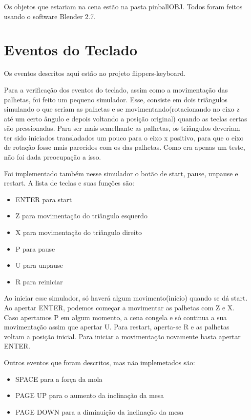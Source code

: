 \documentclass[a4paper,12pt]{article}
\begin{document}
Os objetos que estariam na cena estão na pasta pinballOBJ. Todos foram feitos usando o software Blender 2.7.

\section{Eventos do Teclado}
\mbox{}

Os eventos descritos aqui estão no projeto flippers-keyboard.

Para a verificação dos eventos do teclado, assim como a movimentação das palhetas, foi feito um pequeno simulador. Esse, consiste em dois triângulos simulando o que seriam as palhetas e se 
movimentando(rotacionando no eixo z até um certo ângulo e depois voltando a posição original) quando as teclas certas são pressionadas. Para ser mais semelhante as palhetas, os triângulos
deveriam ter sido iniciados transladados um pouco para o eixo x positivo, para que o eixo de rotação fosse mais parecidos com os das palhetas. Como era apenas um teste, não foi dada 
preocupação a isso.

Foi implementado também nesse simulador o botão de start, pause, unpause e restart. A lista de teclas e suas funções são:

\begin{itemize}
\item ENTER para start
\item Z para movimentação do triângulo esquerdo
\item X para movimentação do triângulo direito
\item P para pause
\item U para unpause
\item R para reiniciar
\end{itemize}

Ao iniciar esse simulador, só haverá algum movimento(início) quando se dá start. Ao apertar ENTER, podemos começar a movimentar as palhetas com Z e X. Caso apertamos P em algum momento, 
a cena congela e só continua a sua movimentação assim que apertar U. Para restart, aperta-se R e as palhetas voltam a posição inicial. Para iniciar a movimentação novamente basta apertar 
ENTER.

Outros eventos que foram descritos, mas não implemetados são:

\begin{itemize}
\item SPACE para a força da mola
\item PAGE UP para o aumento da inclinação da mesa
\item PAGE DOWN para a diminuição da inclinação da mesa
\end{itemize}
\end{document}

